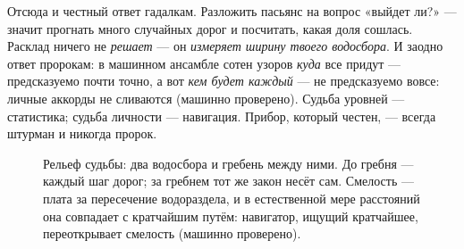\documentclass[11pt,letterpaper]{article}
\begin{document}
Отсюда и честный ответ гадалкам. Разложить пасьянс на вопрос «выйдет
ли?» --- значит прогнать много случайных дорог и посчитать, какая
доля сошлась. Расклад ничего не \emph{решает} --- он \emph{измеряет
ширину твоего водосбора}. И заодно ответ пророкам: в машинном
ансамбле сотен узоров \emph{куда} все придут --- предсказуемо почти
точно, а вот \emph{кем будет каждый} --- не предсказуемо вовсе:
личные аккорды не сливаются (машинно проверено). Судьба уровней ---
статистика; судьба личности --- навигация. Прибор, который честен,
--- всегда штурман и никогда пророк.

\begin{figure}[H]
\centering
{}
\caption{Рельеф судьбы: два водосбора и гребень между ними. До гребня
--- каждый шаг дорог; за гребнем тот же закон несёт сам. Смелость ---
плата за пересечение водораздела, и в естественной мере расстояний
она совпадает с кратчайшим путём: навигатор, ищущий кратчайшее,
переоткрывает смелость (машинно проверено).}
\label{fig:golden}
\end{figure}
\end{document}
